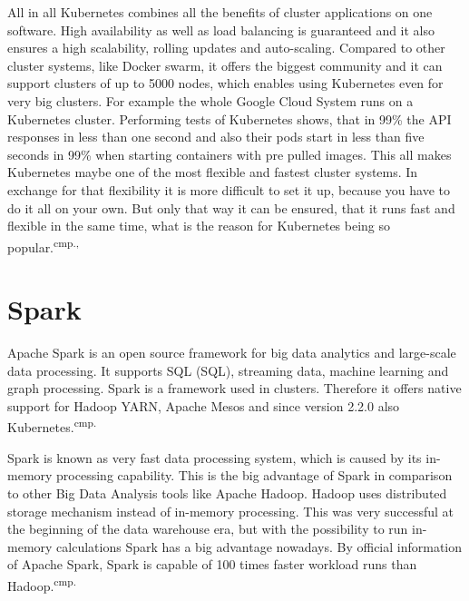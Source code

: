All in all Kubernetes combines all the benefits of cluster applications on one software. High availability as well as load balancing is guaranteed and it also ensures a high scalability, rolling updates and auto-scaling. Compared to other cluster systems, like Docker swarm, it offers the biggest community and it can support clusters of up to 5000 nodes, which enables using Kubernetes even for very big clusters. For example the whole Google Cloud System runs on a Kubernetes cluster. Performing tests of Kubernetes shows, that in 99\% the API responses in less than one second and also their pods start in less than five seconds in 99\% when starting containers with pre pulled images. This all makes Kubernetes maybe one of the most flexible and fastest cluster systems. In exchange for that flexibility it is more difficult to set it up, because you have to do it all on your own. But only that way it can be ensured, that it runs fast and flexible in the same time, what is the reason for Kubernetes being so popular.\textsuperscript{cmp.\cite{19}, \cite{20}}



\section{Spark}

Apache Spark is an open source framework for big data analytics and large-scale data processing. It supports \acs{SQL} (\acl{SQL}), streaming data, machine learning and graph processing. Spark is a framework used in clusters. Therefore it offers native support for Hadoop YARN, Apache Mesos and since version 2.2.0 also Kubernetes.\textsuperscript{cmp.\cite{21}}


Spark is known as very fast data processing system, which is caused by its in-memory processing capability. This is the big advantage of Spark in comparison to other Big Data Analysis tools like Apache Hadoop. Hadoop uses distributed storage mechanism instead of in-memory processing. This was very successful at the beginning of the data warehouse era, but with the possibility to run in-memory calculations Spark has a big advantage nowadays. By official information of Apache Spark, Spark is capable of 100 times faster workload runs than Hadoop.\textsuperscript{cmp.\cite{22}}

